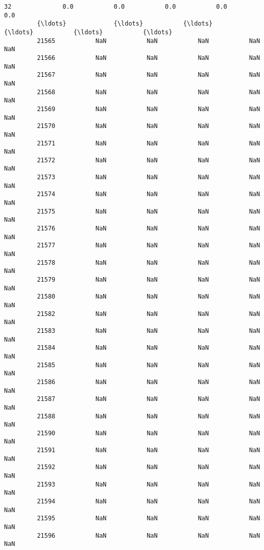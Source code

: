 \documentclass[11pt]{article}
\begin{document}
\begin{Verbatim}[commandchars=\\\{\}]
         32              0.0           0.0           0.0           0.0           0.0   
         {\ldots}             {\ldots}           {\ldots}           {\ldots}           {\ldots}           {\ldots}   
         21565           NaN           NaN           NaN           NaN           NaN   
         21566           NaN           NaN           NaN           NaN           NaN   
         21567           NaN           NaN           NaN           NaN           NaN   
         21568           NaN           NaN           NaN           NaN           NaN   
         21569           NaN           NaN           NaN           NaN           NaN   
         21570           NaN           NaN           NaN           NaN           NaN   
         21571           NaN           NaN           NaN           NaN           NaN   
         21572           NaN           NaN           NaN           NaN           NaN   
         21573           NaN           NaN           NaN           NaN           NaN   
         21574           NaN           NaN           NaN           NaN           NaN   
         21575           NaN           NaN           NaN           NaN           NaN   
         21576           NaN           NaN           NaN           NaN           NaN   
         21577           NaN           NaN           NaN           NaN           NaN   
         21578           NaN           NaN           NaN           NaN           NaN   
         21579           NaN           NaN           NaN           NaN           NaN   
         21580           NaN           NaN           NaN           NaN           NaN   
         21582           NaN           NaN           NaN           NaN           NaN   
         21583           NaN           NaN           NaN           NaN           NaN   
         21584           NaN           NaN           NaN           NaN           NaN   
         21585           NaN           NaN           NaN           NaN           NaN   
         21586           NaN           NaN           NaN           NaN           NaN   
         21587           NaN           NaN           NaN           NaN           NaN   
         21588           NaN           NaN           NaN           NaN           NaN   
         21590           NaN           NaN           NaN           NaN           NaN   
         21591           NaN           NaN           NaN           NaN           NaN   
         21592           NaN           NaN           NaN           NaN           NaN   
         21593           NaN           NaN           NaN           NaN           NaN   
         21594           NaN           NaN           NaN           NaN           NaN   
         21595           NaN           NaN           NaN           NaN           NaN   
         21596           NaN           NaN           NaN           NaN           NaN   
         

\end{Verbatim}
\end{document}
